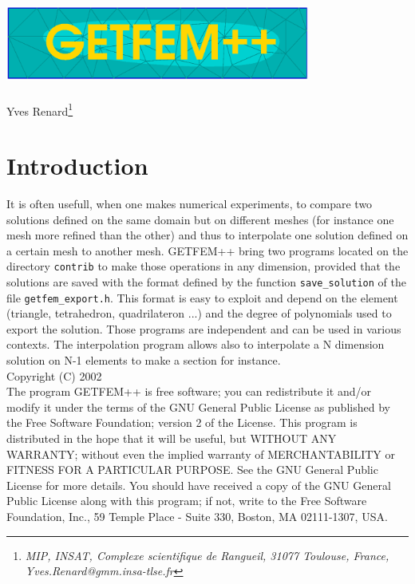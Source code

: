 \documentclass[11pt,a4paper]{article}
\begin{document}
\begin{center}
  \includegraphics[width=10cm,angle=0]{getfem_logo.eps}\\[2cm]
   \\[0.5cm]
  { \large Yves \sc Renard\footnote{ \it MIP, INSAT, Complexe scientifique de Rangueil, 31077 Toulouse, France, Yves.Renard@gmm.insa-tlse.fr } } \\[1.0cm]
\end{center}




\section*{Introduction}

It is often usefull, when one makes numerical experiments, to compare two solutions defined on the same domain but on different meshes (for instance one mesh more refined than the other) and thus to interpolate one solution defined on a certain mesh to another mesh. GETFEM++ bring two programs located on the directory {\tt contrib} to make those operations in any dimension, provided that the solutions are saved with the format defined by the function {\tt save\_solution} of the file {\tt getfem\_export.h}. This format is easy to exploit and depend on the element (triangle, tetrahedron, quadrilateron ...) and the degree of polynomials used to export the solution. Those programs are independent and can be used in various contexts. The interpolation program allows also to interpolate a N dimension solution on N-1 elements to make a section for instance.\\[5cm]
Copyright (C) 2002\\
The program GETFEM++ is free software; you can redistribute it and/or modify
it under the terms of the GNU General Public License as published by
the Free Software Foundation; version 2 of the License.
This program is distributed in the hope that it will be useful,
but WITHOUT ANY WARRANTY; without even the implied warranty of
MERCHANTABILITY or FITNESS FOR A PARTICULAR PURPOSE.  See the
GNU General Public License for more details.
You should have received a copy of the GNU General Public License
along with this program; if not, write to the Free Software Foundation,
Inc., 59 Temple Place - Suite 330, Boston, MA  02111-1307, USA.
\end{document}
